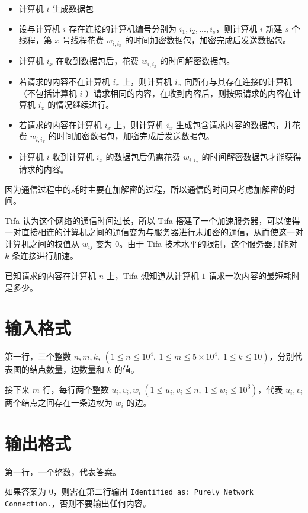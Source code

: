 \documentclass{ctpro}
\begin{document}
\begin{itemize}
    \item 计算机 $i$ 生成数据包
    \item 设与计算机 $i$ 存在连接的计算机编号分别为 $i_1,i_2,...,i_s$，则计算机 $i$ 新建 $s$ 个线程，第 $x$ 号线程花费 $w_{i,i_x}$ 的时间加密数据包，加密完成后发送数据包。
    \item 计算机 $i_x$ 在收到数据包后，花费 $w_{i,i_x}$ 的时间解密数据包。
    \item 若请求的内容不在计算机 $i_x$ 上，则计算机 $i_x$ 向所有与其存在连接的计算机（不包括计算机 $i$ ）请求相同的内容，在收到内容后，则按照请求的内容在计算机 $i_x$ 的情况继续进行。
    \item 若请求的内容在计算机 $i_x$ 上，则计算机 $i_x$ 生成包含请求内容的数据包，并花费 $w_{i,i_x}$ 的时间加密数据包，加密完成后发送数据包。
    \item 计算机 $i$ 收到计算机 $i_x$ 的数据包后仍需花费 $w_{i,i_x}$ 的时间解密数据包才能获得请求的内容。
\end{itemize}

因为通信过程中的耗时主要在加解密的过程，所以通信的时间只考虑加解密的时间。

Tifa 认为这个网络的通信时间过长，所以 Tifa 搭建了一个加速服务器，可以使得一对直接相连的计算机之间的通信变为与服务器进行未加密的通信，从而使这一对计算机之间的权值从 $w_{ij}$ 变为 $0$。由于 Tifa 技术水平的限制，这个服务器只能对 $k$ 条连接进行加速。

已知请求的内容在计算机 $n$ 上，Tifa 想知道从计算机 $1$ 请求一次内容的最短耗时是多少。

\section*{输入格式}

第一行，三个整数 $n,m,k,~(1 \leq n \leq {10}^4,~1 \leq m \leq 5 \times {10}^4,~1 \leq k \leq 10)$，分别代表图的结点数量，边数量和 $k$ 的值。

接下来 $m$ 行，每行两个整数 $u_i,v_i,w_i~(1 \leq u_i,v_i \leq n,~1 \leq w_i \leq {10}^3)$，代表 $u_i,v_i$ 两个结点之间存在一条边权为 $w_i$ 的边。

\section*{输出格式}

第一行，一个整数，代表答案。

如果答案为 $0$，则需在第二行输出 \verb|Identified as: Purely Network Connection.|，否则不要输出任何内容。
\end{document}
